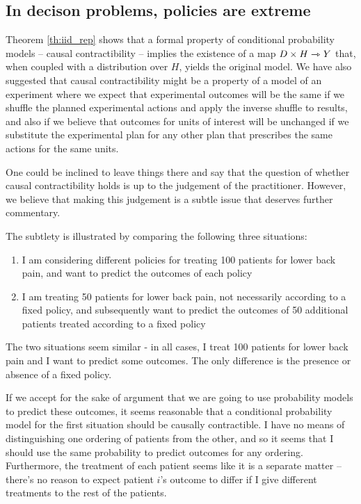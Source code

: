 \subsection{In decison problems, policies are extreme}

Theorem \ref{th:iid_rep} shows that a formal property of conditional probability models -- causal contractibility -- implies the existence of a map $D\times H\rightarrowtriangle Y$ that, when coupled with a distribution over $H$, yields the original model. We have also suggested that causal contractibility might be a property of a model of an experiment where we expect that experimental outcomes will be the same if we shuffle the planned experimental actions and apply the inverse shuffle to results, and also if we believe that outcomes for units of interest will be unchanged if we substitute the experimental plan for any other plan that prescribes the same actions for the same units.

One could be inclined to leave things there and say that the question of whether causal contractibility holds is up to the judgement of the practitioner. However, we believe that making this judgement is a subtle issue that deserves further commentary.

The subtlety is illustrated by comparing the following three situations:

\begin{enumerate}
    \item I am considering different policies for treating 100 patients for lower back pain, and want to predict the outcomes of each policy
    \item I am treating 50 patients for lower back pain, not necessarily according to a fixed policy, and subsequently want to predict the outcomes of 50 additional patients treated according to a fixed policy
\end{enumerate}

The two situations seem similar - in all cases, I treat 100 patients for lower back pain and I want to predict some outcomes. The only difference is the presence or absence of a fixed policy.

If we accept for the sake of argument that we are going to use probability models to predict these outcomes, it seems reasonable that a conditional probability model for the first situation should be causally contractible. I have no means of distinguishing one ordering of patients from the other, and so it seems that I should use the same probability to predict outcomes for any ordering. Furthermore, the treatment of each patient seems like it is a separate matter -- there's no reason to expect patient $i$'s outcome to differ if I give different treatments to the rest of the patients.

